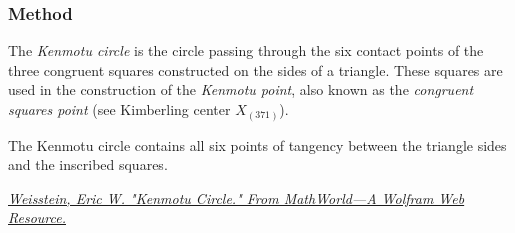 \begin{tkzexample}[latex=.5\textwidth]
\begin{center}
    \end{center}
\end{tkzexample}


\subsubsection{Method }
\label{ssub:kenmotu_circle}

The \emph{Kenmotu circle} is the circle passing through the six contact points of the three congruent squares constructed on the sides of a triangle. These squares are used in the construction of the \emph{Kenmotu point}, also known as the \emph{congruent squares point} (see Kimberling center $X_{(371)}$).

The Kenmotu circle contains all six points of tangency between the triangle sides and the inscribed squares.
\begin{flushright}
\small
\href{https://mathworld.wolfram.com/KenmotuCircle.html}
{\textit{Weisstein, Eric W. "Kenmotu Circle." From MathWorld—A Wolfram Web Resource.}}
\end{flushright}

\vspace{1em}


